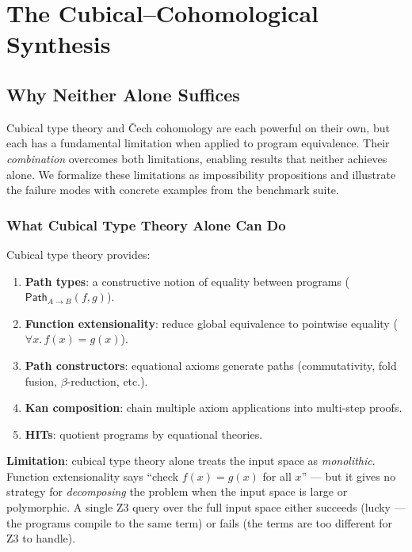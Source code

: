 \documentclass[11pt,a4paper]{report}
\theoremstyle{definition}
\theoremstyle{plain}
\newcommand{\Path}{\mathsf{Path}}
\begin{document}
\part{The Cubical--Cohomological Synthesis}

\chapter{Why Neither Alone Suffices}
\label{ch:neither-alone}

Cubical type theory and \v{C}ech cohomology are each powerful on their
own, but each has a fundamental limitation when applied to program
equivalence.  Their \emph{combination} overcomes both limitations,
enabling results that neither achieves alone.  We formalize these
limitations as impossibility propositions and illustrate the failure
modes with concrete examples from the benchmark suite.

\section{What Cubical Type Theory Alone Can Do}

Cubical type theory provides:
\begin{enumerate}
  \item \textbf{Path types}: a constructive notion of equality between
    programs ($\Path_{A \to B}(f, g)$).
  \item \textbf{Function extensionality}: reduce global equivalence to
    pointwise equality ($\forall x.\, f(x) = g(x)$).
  \item \textbf{Path constructors}: equational axioms generate paths
    (commutativity, fold fusion, $\beta$-reduction, etc.).
  \item \textbf{Kan composition}: chain multiple axiom applications
    into multi-step proofs.
  \item \textbf{HITs}: quotient programs by equational theories.
\end{enumerate}

\textbf{Limitation}: cubical type theory alone treats the input space
as \emph{monolithic}.  Function extensionality says ``check $f(x) =
g(x)$ for all $x$'' --- but it gives no strategy for \emph{decomposing}
the problem when the input space is large or polymorphic.  A single
Z3 query over the full input space either succeeds (lucky --- the
programs compile to the same term) or fails (the terms are too
different for Z3 to handle).
\end{document}
